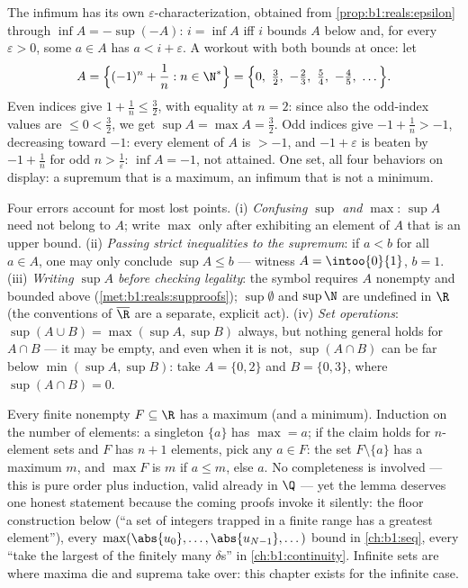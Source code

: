 \begin{example}\label{ex:b1:reals:infmirror}
The infimum has its own $\varepsilon$-characterization, obtained
from \cref{prop:b1:reals:epsilon} through $\inf A = -\sup(-A)$:
$i = \inf A$ iff $i$ bounds $A$ below and, for every
$\varepsilon > 0$, some $a \in A$ has $a < i + \varepsilon$. A
workout with both bounds at once: let
\[
A = \Bigl\{(-1)^n + \frac1n : n \in \N^*\Bigr\}
= \Bigl\{0,\ \tfrac32,\ -\tfrac23,\ \tfrac54,\ -\tfrac45,\
\dots\Bigr\} .
\]
Even indices give $1 + \frac1n \leq \frac32$, with equality at
$n = 2$: since also the odd-index values are $\leq 0 <
\frac32$, we get $\sup A = \max A = \frac32$. Odd indices give
$-1 + \frac1n > -1$, decreasing toward $-1$: every element of
$A$ is $> -1$, and $-1 + \varepsilon$ is beaten by $-1 +
\frac1n$ for odd $n > \frac1\varepsilon$: $\inf A = -1$, not
attained. One set, all four behaviors on display: a supremum
that is a maximum, an infimum that is not a minimum.
\end{example}

\begin{remark}
Four errors account for most lost points. (i) \emph{Confusing
$\sup$ and $\max$}: $\sup A$ need not belong to $A$; write $\max$
only after exhibiting an element of $A$ that is an upper bound.
(ii) \emph{Passing strict inequalities to the supremum}: if $a <
b$ for all $a \in A$, one may only conclude $\sup A \leq b$ ---
witness $A = \intoo{0}{1}$, $b = 1$. (iii) \emph{Writing $\sup A$
before checking legality}: the symbol requires $A$ nonempty and
bounded above (\cref{met:b1:reals:supproofs}); $\sup \emptyset$
and $\sup \N$ are undefined in $\R$ (the conventions of
$\overline\R$ are a separate, explicit act). (iv) \emph{Set
operations}: $\sup(A \cup B) = \max(\sup A, \sup B)$ always, but
nothing general holds for $A \cap B$ --- it may be empty, and
even when it is not, $\sup(A \cap B)$ can be far below
$\min(\sup A, \sup B)$: take $A = \{0, 2\}$ and $B = \{0, 3\}$,
where $\sup(A \cap B) = 0$.
\end{remark}

\begin{example}\label{ex:b1:reals:finitemax}
Every finite nonempty $F \subseteq \R$ has a maximum (and a
minimum). Induction on the number of elements: a singleton
$\{a\}$ has $\max = a$; if the claim holds for $n$-element sets
and $F$ has $n + 1$ elements, pick any $a \in F$: the set $F
\setminus \{a\}$ has a maximum $m$, and $\max F$ is $m$ if $a
\leq m$, else $a$. No completeness is involved --- this is pure
order plus induction, valid already in $\Q$ --- yet the lemma
deserves one honest statement because the coming proofs invoke
it silently: the floor construction below (``a set of integers
trapped in a finite range has a greatest element''), every
$\max(\abs{u_0}, \dots, \abs{u_{N-1}}, \dots)$ bound in
\cref{ch:b1:seq}, every ``take the largest of the finitely many
$\delta$s'' in \cref{ch:b1:continuity}. Infinite sets are where
maxima die and suprema take over: this chapter exists for the
infinite case.
\end{example}


